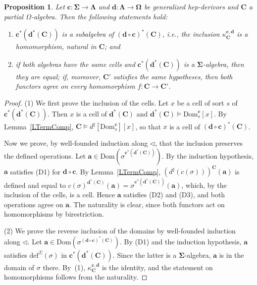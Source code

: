 \documentclass[a4paper,reqno]{amsart}
\newcommand{\sig}[1]{\mathbf{#1}}                %
\newcommand{\Dom}{\mathrm{Dom}}
\newcommand{\mor}{\to}
\newcommand{\defi}{\mathrm{def}}
\theoremstyle{plain}
\newtheorem{proposition}[theorem]{Proposition}
\theoremstyle{definition}
\begin{document}
\begin{proposition}\label{PHepComp}
Let $\mathbf{c}\colon\sig{\Sigma}\mor\sig{\Lambda}$ and $\mathbf{d}\colon\sig{\Lambda}\mor\sig{\Omega}$ be generalized hep-derivors and $\mathbf{C}$ a partial $\Omega$-algebra.
Then the following statements hold:
\begin{enumerate}
\item $\mathbf{c}^{\ast}(\mathbf{d}^{\ast}(\mathbf{C}))$ is a subalgebra of $(\mathbf{d}\circ\mathbf{c})^{\ast}(\mathbf{C})$, i.e., the inclusion $\kappa^{\mathbf{c},\mathbf{d}}_{\mathbf{C}}$ is a homomorphism, natural in $\mathbf{C}$; and
\item if both algebras have the same cells and $\mathbf{c}^{\ast}(\mathbf{d}^{\ast}(\mathbf{C}))$ is a $\sig{\Sigma}$-algebra, then they are equal; if, moreover, $\mathbf{C}'$ satisfies the same hypotheses, then both functors agree on every homomorphism $f\colon\mathbf{C}\mor\mathbf{C}'$.
\end{enumerate}
\end{proposition}
\begin{proof}
(1) We first prove the inclusion of the cells.
Let $x$ be a cell of sort $s$ of $\mathbf{c}^{\ast}(\mathbf{d}^{\ast}(\mathbf{C}))$.
Then $x$ is a cell of $\mathbf{d}^{\ast}(\mathbf{C})$ and $\mathbf{d}^{\ast}(\mathbf{C})\models\Dom^{\mathbf{c}}_{s}[x]$.
By Lemma~\ref{LTermComp}, $\mathbf{C}\models d^{\sharp}[\Dom^{\mathbf{c}}_{s}][x]$, so that $x$ is a cell of $(\mathbf{d}\circ\mathbf{c})^{\ast}(\mathbf{C})$.

Now we prove, by well-founded induction along $\lhd$, that the inclusion preserves the defined operations.
Let $\mathbf{a}\in\Dom(\sigma^{\mathbf{c}^{\ast}(\mathbf{d}^{\ast}(\mathbf{C}))})$.
By the induction hypothesis, $\mathbf{a}$ satisfies (D1) for $\mathbf{d}\circ\mathbf{c}$.
By Lemma~\ref{LTermComp}, $(d^{\sharp}(c(\sigma)))^{\mathbf{C}}(\mathbf{a})$ is defined and equal to $c(\sigma)^{\mathbf{d}^{\ast}(\mathbf{C})}(\mathbf{a})=\sigma^{\mathbf{c}^{\ast}(\mathbf{d}^{\ast}(\mathbf{C}))}(\mathbf{a})$, which, by the inclusion of the cells, is a cell.
Hence $\mathbf{a}$ satisfies (D2) and (D3), and both operations agree on $\mathbf{a}$.
The naturality is clear, since both functors act on homomorphisms by birestriction.

(2) We prove the reverse inclusion of the domains by well-founded induction along $\lhd$.
Let $\mathbf{a}\in\Dom(\sigma^{(\mathbf{d}\circ\mathbf{c})^{\ast}(\mathbf{C})})$.
By (D1) and the induction hypothesis, $\mathbf{a}$ satisfies $\defi^{\Sigma}(\sigma)$ in $\mathbf{c}^{\ast}(\mathbf{d}^{\ast}(\mathbf{C}))$.
Since the latter is a $\sig{\Sigma}$-algebra, $\mathbf{a}$ is in the domain of $\sigma$ there.
By~(1), $\kappa^{\mathbf{c},\mathbf{d}}_{\mathbf{C}}$ is the identity, and the statement on homomorphisms follows from the naturality.
\end{proof}
\end{document}
